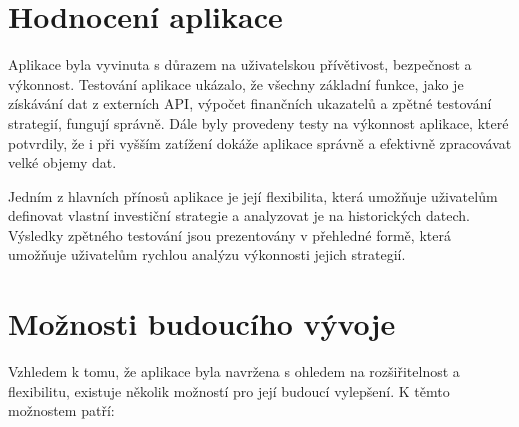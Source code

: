 \documentclass[12pt, a4paper]{report}
\begin{document}
\section{Hodnocení aplikace}


Aplikace byla vyvinuta s důrazem na uživatelskou přívětivost, bezpečnost a výkonnost. Testování aplikace ukázalo, že všechny základní funkce, jako je získávání dat z externích API, výpočet finančních ukazatelů a zpětné testování strategií, fungují správně. Dále byly provedeny testy na výkonnost aplikace, které potvrdily, že i při vyšším zatížení dokáže aplikace správně a efektivně zpracovávat velké objemy dat.

Jedním z hlavních přínosů aplikace je její flexibilita, která umožňuje uživatelům definovat vlastní investiční strategie a analyzovat je na historických datech. Výsledky zpětného testování jsou prezentovány v přehledné formě, která umožňuje uživatelům rychlou analýzu výkonnosti jejich strategií.


\section{Možnosti budoucího vývoje}


Vzhledem k tomu, že aplikace byla navržena s ohledem na rozšiřitelnost a flexibilitu, existuje několik možností pro její budoucí vylepšení. K těmto možnostem patří:
\end{document}
